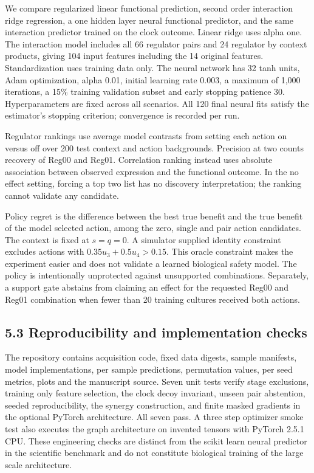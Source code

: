 \documentclass[
  11pt,
  letterpaper,
]{article}
\begin{document}
We compare regularized linear functional prediction, second order
interaction ridge regression, a one hidden layer neural functional
predictor, and the same interaction predictor trained on the clock
outcome. Linear ridge uses alpha one. The interaction model includes all
66 regulator pairs and 24 regulator by context products, giving 104
input features including the 14 original features. Standardization uses
training data only. The neural network has 32 tanh units, Adam
optimization, alpha 0.01, initial learning rate 0.003, a maximum of
1,000 iterations, a 15\% training validation subset and early stopping
patience 30. Hyperparameters are fixed across all scenarios. All 120
final neural fits satisfy the estimator's stopping criterion;
convergence is recorded per run.

Regulator rankings use average model contrasts from setting each action
on versus off over 200 test context and action backgrounds. Precision at
two counts recovery of Reg00 and Reg01. Correlation ranking instead uses
absolute association between observed expression and the functional
outcome. In the no effect setting, forcing a top two list has no
discovery interpretation; the ranking cannot validate any candidate.

Policy regret is the difference between the best true benefit and the
true benefit of the model selected action, among the zero, single and
pair action candidates. The context is fixed at \(s=q=0\). A simulator
supplied identity constraint excludes actions with
\(0.35u_3+0.5u_4>0.15\). This oracle constraint makes the experiment
easier and does not validate a learned biological safety model. The
policy is intentionally unprotected against unsupported combinations.
Separately, a support gate abstains from claiming an effect for the
requested Reg00 and Reg01 combination when fewer than 20 training
cultures received both actions.

\hypertarget{reproducibility-and-implementation-checks}{%
\subsection{5.3 Reproducibility and implementation
checks}\label{reproducibility-and-implementation-checks}}

The repository contains acquisition code, fixed data digests, sample
manifests, model implementations, per sample predictions, permutation
values, per seed metrics, plots and the manuscript source. Seven unit
tests verify stage exclusions, training only feature selection, the
clock decoy invariant, unseen pair abstention, seeded reproducibility,
the synergy construction, and finite masked gradients in the optional
PyTorch architecture. All seven pass. A three step optimizer smoke test
also executes the graph architecture on invented tensors with PyTorch
2.5.1 CPU. These engineering checks are distinct from the scikit learn
neural predictor in the scientific benchmark and do not constitute
biological training of the large scale architecture.
\end{document}
